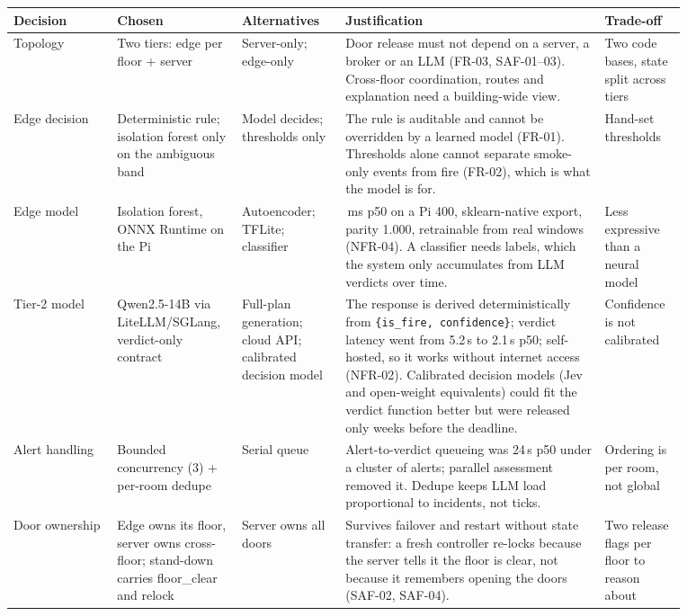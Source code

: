 \documentclass[11pt]{article}
\begin{document}
\begin{longtable}[]{@{}
  >{\raggedright\arraybackslash}p{0.14\linewidth}
  >{\raggedright\arraybackslash}p{0.13\linewidth}
  >{\raggedright\arraybackslash}p{0.14\linewidth}
  >{\raggedright\arraybackslash}p{0.35\linewidth}
  >{\raggedright\arraybackslash}p{0.11\linewidth}@{}}
\toprule
\textbf{Decision} & \textbf{Chosen} & \textbf{Alternatives} & \textbf{Justification} & \textbf{Trade-off} \\
\midrule
\endhead
Topology & Two tiers: edge per floor + server & Server-only; edge-only & Door release must not depend on a server, a broker or an LLM (FR-03, SAF-01--03). Cross-floor coordination, routes and explanation need a building-wide view. & Two code bases, state split across tiers \\
Edge decision & Deterministic rule; isolation forest only on the ambiguous band & Model decides; thresholds only & The rule is auditable and cannot be overridden by a learned model (FR-01). Thresholds alone cannot separate smoke-only events from fire (FR-02), which is what the model is for. & Hand-set thresholds \\
Edge model & Isolation forest, ONNX Runtime on the Pi & Autoencoder; TFLite; classifier & 17.8\,ms p50 on a Pi 400, sklearn-native export, parity 1.000, retrainable from real windows (NFR-04). A classifier needs labels, which the system only accumulates from LLM verdicts over time. & Less expressive than a neural model \\
Tier-2 model & Qwen2.5-14B via LiteLLM/SGLang, verdict-only contract & Full-plan generation; cloud API; calibrated decision model & The response is derived deterministically from \texttt{\{is\_fire, confidence\}}; verdict latency went from 5.2\,s to 2.1\,s p50; self-hosted, so it works without internet access (NFR-02). Calibrated decision models (Jev and open-weight equivalents) could fit the verdict function better but were released only weeks before the deadline. & Confidence is not calibrated \\
Alert handling & Bounded concurrency (3) + per-room dedupe & Serial queue & Alert-to-verdict queueing was 24\,s p50 under a cluster of alerts; parallel assessment removed it. Dedupe keeps LLM load proportional to incidents, not ticks. & Ordering is per room, not global \\
Door ownership & Edge owns its floor, server owns cross-floor; stand-down carries floor\_clear and relock & Server owns all doors & Survives failover and restart without state transfer: a fresh controller re-locks because the server tells it the floor is clear, not because it remembers opening the doors (SAF-02, SAF-04). & Two release flags per floor to reason about \\

\end{longtable}
\end{document}
